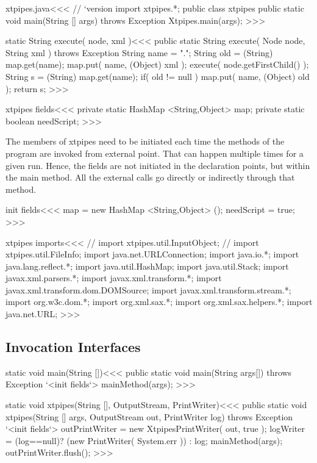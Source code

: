 \documentclass{article}
\begin{document}
{\<xtpipes.java\><<<
// `version
import xtpipes.*;
public class xtpipes {
  public static void main(String [] args) throws Exception {
    Xtpipes.main(args);
} }
>>>


\<static String execute( node, xml )\><<<
public static String execute( Node node, String xml )
                                      throws Exception {
  String name = ".";
  String old = (String) map.get(name);
  map.put( name, (Object) xml );
  execute( node.getFirstChild() );
  String s = (String) map.get(name);
  if( old != null ){ map.put( name, (Object) old ); }
  return s;
}
>>>







\<xtpipes fields\><<<
private static HashMap <String,Object> map;
private static boolean needScript;
>>>


The members of xtpipes need to be initiated each time the methods of
the program are invoked from external point.  That can happen multiple
times for a given run. Hence, the fields are not initiated in the
declaration points, but within the main method.  All the external
calls go directly or indirectly through that method.


\<init fields\><<<
map = new HashMap  <String,Object> ();
needScript = true;
>>>


\<xtpipes imports\><<<
// import xtpipes.util.InputObject;
// import xtpipes.util.FileInfo;
import java.net.URLConnection;
import java.io.*;
import java.lang.reflect.*;
import java.util.HashMap;
import java.util.Stack;
import javax.xml.parsers.*;
import javax.xml.transform.*;
import javax.xml.transform.dom.DOMSource;
import javax.xml.transform.stream.*;
import org.w3c.dom.*;
import org.xml.sax.*;
import org.xml.sax.helpers.*;
import java.net.URL;
>>>

\subsection{Invocation Interfaces}

\<static void main(String [])\><<<
public static void main(String args[]) throws Exception {
  `<init fields`>
  mainMethod(args);
}
>>>




\<static void xtpipes(String [], OutputStream, PrintWriter)\><<<
public static void xtpipes(String [] args,
                           OutputStream out,
                           PrintWriter log)
                                                throws Exception {
  `<init fields`>
  outPrintWriter = new XtpipesPrintWriter( out, true );
  logWriter = (log==null)? (new PrintWriter( System.err )) : log;
  mainMethod(args);
  outPrintWriter.flush();
}
>>>



}
\end{document}
